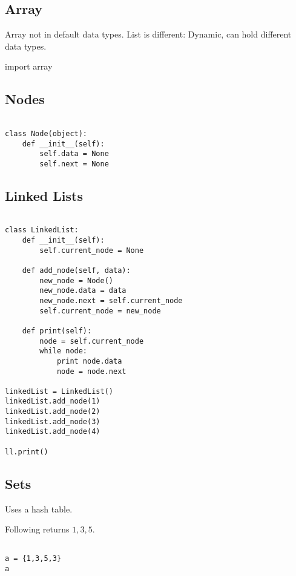 
\subsection{Array}

Array not in default data types. List is different: Dynamic, can hold different data types.

import array

\subsection{Nodes}

\begin{verbatim}

class Node(object):
    def __init__(self):
        self.data = None
        self.next = None

\end{verbatim}


\subsection{Linked Lists}

\begin{verbatim}

class LinkedList:
    def __init__(self):
        self.current_node = None

    def add_node(self, data):
        new_node = Node()
        new_node.data = data
        new_node.next = self.current_node
        self.current_node = new_node

    def print(self):
        node = self.current_node
        while node:
            print node.data
            node = node.next
            
linkedList = LinkedList()
linkedList.add_node(1)
linkedList.add_node(2)
linkedList.add_node(3)
linkedList.add_node(4)

ll.print()

\end{verbatim}

\subsection{Sets}

Uses a hash table.

Following returns \(1, 3, 5\).
\begin{verbatim}

a = {1,3,5,3}
a

\end{verbatim}

